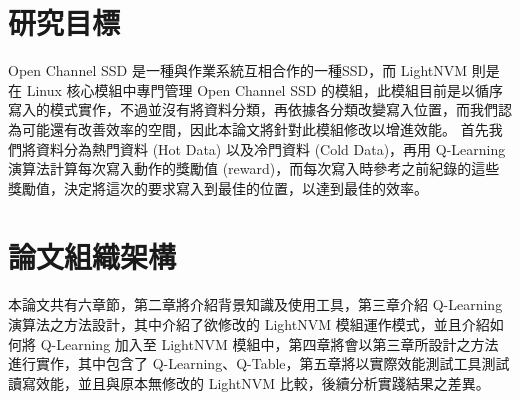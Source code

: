 
\section{研究目標}
\indent
Open Channel SSD 是一種與作業系統互相合作的一種SSD，而 LightNVM 則是在 Linux 核心模組中專門管理 Open Channel SSD 的模組，此模組目前是以循序寫入的模式實作，不過並沒有將資料分類，再依據各分類改變寫入位置，而我們認為可能還有改善效率的空間，因此本論文將針對此模組修改以增進效能。
\indent
首先我們將資料分為熱門資料 (Hot Data) 以及冷門資料 (Cold Data)，再用 Q-Learning 演算法計算每次寫入動作的獎勵值 (reward)，而每次寫入時參考之前紀錄的這些獎勵值，決定將這次的要求寫入到最佳的位置，以達到最佳的效率。


\section{論文組織架構}
\indent
本論文共有六章節，第二章將介紹背景知識及使用工具，第三章介紹 Q-Learning 演算法之方法設計，其中介紹了欲修改的 LightNVM 模組運作模式，並且介紹如何將 Q-Learning 加入至 LightNVM 模組中，第四章將會以第三章所設計之方法進行實作，其中包含了 Q-Learning、Q-Table，第五章將以實際效能測試工具測試讀寫效能，並且與原本無修改的 LightNVM 比較，後續分析實踐結果之差異。

